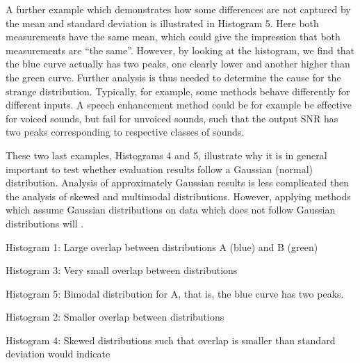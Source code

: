\documentclass[letterpaper,10pt,english]{jupyterBook}
\begin{document}
\sphinxAtStartPar
A further example which demonstrates how some differences are not
captured by the mean and standard deviation is illustrated in Histogram
5. Here both measurements have the same mean, which could give the
impression that both measurements are “the same”. However, by looking at
the histogram, we find that the blue curve actually has two peaks, one
clearly lower and another higher than the green curve. Further analysis
is thus needed to determine the cause for the strange distribution.
Typically, for example, some methods behave differently for different
inputs. A speech enhancement method could be for example be effective
for voiced sounds, but fail for unvoiced sounds, such that the output
SNR has two peaks corresponding to respective classes of sounds.

\sphinxAtStartPar
These two last examples, Histograms 4 and 5, illustrate why it is in
general important to test whether evaluation results follow a Gaussian
(normal) distribution. Analysis of approximately Gaussian results is
less complicated then the analysis of skewed and multi\sphinxhyphen{}modal
distributions. However, applying methods which assume Gaussian
distributions on data which does not follow Gaussian distributions will
.

\sphinxAtStartPar
Histogram 1: Large overlap between distributions A (blue) and B (green)

\sphinxAtStartPar
{}

\sphinxAtStartPar
Histogram 3: Very small overlap between distributions

\sphinxAtStartPar
{}

\sphinxAtStartPar
Histogram 5: Bimodal distribution for A, that is, the blue curve has two
peaks.

\sphinxAtStartPar
{}

\sphinxAtStartPar
Histogram 2: Smaller overlap between distributions

\sphinxAtStartPar
{}
Histogram 4: Skewed distributions such that overlap is smaller than
standard deviation would indicate

\sphinxAtStartPar
{}
\end{document}
